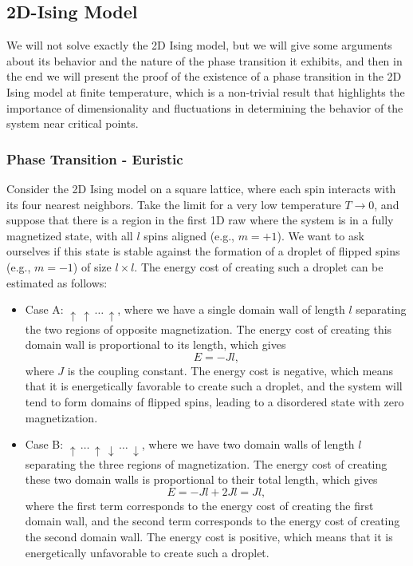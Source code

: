 \subsection{2D-Ising Model}

We will not solve exactly the 2D Ising model, but we will give some arguments about its behavior and the nature of the phase transition it exhibits, and then in the end we will present the proof of the existence of a phase transition in the 2D Ising model at finite temperature, which is a non-trivial result that highlights the importance of dimensionality and fluctuations in determining the behavior of the system near critical points.

\subsubsection{Phase Transition - Euristic}

Consider the 2D Ising model on a square lattice, where each spin interacts with its four nearest neighbors. Take the limit for a very low temperature \(T \to 0\), and suppose that there is a region in the first 1D raw where the system is in a fully magnetized state, with all \(l\) spins aligned (e.g., \(m = +1\)). We want to ask ourselves if this state is stable against the formation of a droplet of flipped spins (e.g., \(m = -1\)) of size \(l \times l\). The energy cost of creating such a droplet can be estimated as follows:
\begin{itemize}
    \item Case A: \(\uparrow\,\uparrow\,\dots \,\uparrow \), where we have a single domain wall of length \(l\) separating the two regions of opposite magnetization. The energy cost of creating this domain wall is proportional to its length, which gives
          \[
              E = - J l,
          \]
          where \(J\) is the coupling constant. The energy cost is negative, which means that it is energetically favorable to create such a droplet, and the system will tend to form domains of flipped spins, leading to a disordered state with zero magnetization.
    \item Case B: \(\uparrow\,\dots \,\uparrow \,\downarrow\,\dots \,\downarrow \), where we have two domain walls of length \(l\) separating the three regions of magnetization. The energy cost of creating these two domain walls is proportional to their total length, which gives
          \[
              E = - J l + 2 J l = J l,
          \]
          where the first term corresponds to the energy cost of creating the first domain wall, and the second term corresponds to the energy cost of creating the second domain wall. The energy cost is positive, which means that it is energetically unfavorable to create such a droplet.
\end{itemize}

